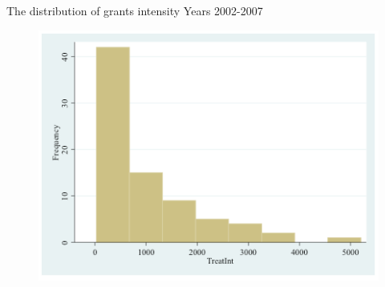 \documentclass[10pt,handout,xcolor=pdftex,dvipsnames,table]{beamer}
\begin{document}
\begin{frame}{The distribution of grants intensity}
{Years 2002-2007}
\begin{figure}[t]
\centering
\includegraphics[width=.8\textwidth]{./Figs/TIdistr.png}
\end{figure}
\end{frame}
\end{document}
